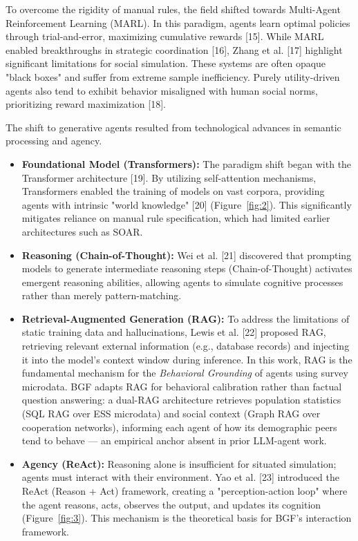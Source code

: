
To overcome the rigidity of manual rules, the field shifted towards Multi-Agent Reinforcement Learning (MARL). In this paradigm, agents learn optimal policies through trial-and-error, maximizing cumulative rewards [15]. While MARL enabled breakthroughs in strategic coordination [16], Zhang et al. [17] highlight significant limitations for social simulation. These systems are often opaque "black boxes" and suffer from extreme sample inefficiency. Purely utility-driven agents also tend to exhibit behavior misaligned with human social norms, prioritizing reward maximization [18].


The shift to generative agents resulted from technological advances in semantic processing and agency.

\begin{itemize}
\item \textbf{Foundational Model (Transformers):} The paradigm shift began with the Transformer architecture [19]. By utilizing self-attention mechanisms, Transformers enabled the training of models on vast corpora, providing agents with intrinsic "world knowledge" [20] (Figure~\ref{fig:2}). This significantly mitigates reliance on manual rule specification, which had limited earlier architectures such as SOAR.
\item \textbf{Reasoning (Chain-of-Thought):} Wei et al. [21] discovered that prompting models to generate intermediate reasoning steps (Chain-of-Thought) activates emergent reasoning abilities, allowing agents to simulate cognitive processes rather than merely pattern-matching.
\item \textbf{Retrieval-Augmented Generation (RAG):} To address the limitations of static training data and hallucinations, Lewis et al. [22] proposed RAG, retrieving relevant external information (e.g., database records) and injecting it into the model's context window during inference. In this work, RAG is the fundamental mechanism for the \textit{Behavioral Grounding} of agents using survey microdata. BGF adapts RAG for behavioral calibration rather than factual question answering: a dual-RAG architecture retrieves population statistics (SQL RAG over ESS microdata) and social context (Graph RAG over cooperation networks), informing each agent of how its demographic peers tend to behave — an empirical anchor absent in prior LLM-agent work.
\item \textbf{Agency (ReAct):} Reasoning alone is insufficient for situated simulation; agents must interact with their environment. Yao et al. [23] introduced the ReAct (Reason + Act) framework, creating a "perception-action loop" where the agent reasons, acts, observes the output, and updates its cognition (Figure~\ref{fig:3}). This mechanism is the theoretical basis for BGF's interaction framework.
\end{itemize}

